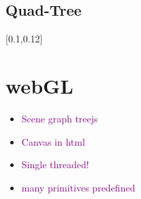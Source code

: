 \documentclass[main.tex,fontsize=12pt,paper=a4,paper=landscape,DIV=calc,]{scrartcl}
\begin{document}
\begin{multicols*}{4}
\subsection{Quad-Tree}
[0.1,0.12]

\section{webGL}
\begin{itemize}
\item \textcolor{purple}{Scene graph treejs}
\item \textcolor{purple}{Canvas in html}
\item \textcolor{purple}{Single threaded!}
\item \textcolor{purple}{many primitives predefined}
\end{itemize} 


\end{multicols*}
\end{document}
